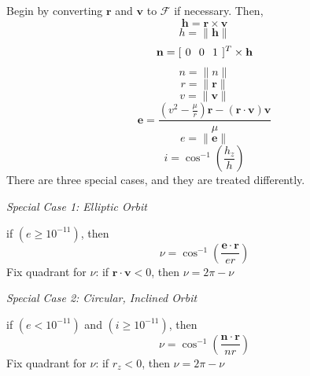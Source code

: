 Begin by converting  $\mathbf{r}$ and $\mathbf{v}$ to  $\mathcal{F}$
if necessary.  Then,
\begin{equation}
     \mathbf{h} = \mathbf{r} \times \mathbf{v}
\end{equation}
%
\begin{equation}
     h = \|\mathbf{h} \|
\end{equation}
%
\begin{equation}
     \mathbf{n} = [ \hspace{0.05 in} 0 \hspace{0.1 in} 0 \hspace{0.1 in} 1 \hspace{0.05
     in}]^T \times \mathbf{h}
\end{equation}
%
\begin{equation}
     n = \| n\|
\end{equation}
%
\begin{equation}
    r = \| \mathbf{r} \|
\end{equation}
%
\begin{equation}
    v = \| \mathbf{v} \|
\end{equation}
%
\begin{equation}
     \mathbf{e} = \displaystyle\frac{(v^2 - \displaystyle\frac{\mu}{r} )\mathbf{r} - (\mathbf{r}\cdot\mathbf{v}  )\mathbf{v}}{\mu}
\end{equation}
%
\begin{equation}
     e = \| \mathbf{e} \|
\end{equation}
%
\begin{equation}
     i = \cos^{-1}\left(\frac{h_z}{h}\right)
\end{equation}
%
There are three special cases, and they are treated differently.

\noindent\textit{Special Case 1:  Elliptic Orbit  }

\noindent if $(e \geq 10^{-11})$, then
%
\begin{equation}
    \nu = \cos^{-1}\left( \frac{\mathbf{e}\cdot\mathbf{r}}{er}\right)
\end{equation}
%
Fix quadrant for $\nu $:  if $\mathbf{r} \cdot \mathbf{v} < 0$, then
$\nu = 2\pi - \nu$

\noindent\textit{Special Case 2:  Circular, Inclined Orbit  }

\noindent if $(e < 10^{-11})$  and $(i \geq 10^{-11})$, then
%
\begin{equation}
    \nu = \cos^{-1}\left( \frac{\mathbf{n}\cdot\mathbf{r}}{nr}\right)
\end{equation}
%
Fix quadrant for $\nu$:  if $r_z < 0$, then $\nu = 2\pi - \nu$

